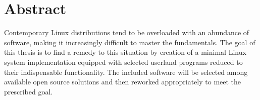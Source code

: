 \section{Abstract}\label{Abstract}
Contemporary Linux distributions tend to be overloaded with an abundance of software, making it increasingly difficult to master the fundamentals.
The goal of this thesis is to find a remedy to this situation by creation of a minimal Linux system implementation equipped with selected userland programs reduced to their indispensable functionality. The included software will be selected among available open source solutions and then reworked appropriately to meet the prescribed goal.

